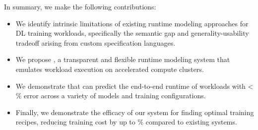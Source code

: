 \noindent In summary, we make the following contributions:

\begin{itemize}[leftmargin=*,itemsep=3pt,topsep=3pt]
\item We identify intrinsic limitations of existing runtime modeling approaches for DL training workloads, specifically the semantic gap and generality-usability tradeoff arising from custom specification languages.
\item We propose \sysname, a transparent and flexible runtime modeling system that emulates workload execution on accelerated compute clusters.
\item We demonstrate that \sysname can predict the end-to-end runtime of workloads with < \evalpe{}\% error across a variety of models and training configurations.
\item Finally, we demonstrate the efficacy of our system for finding optimal training recipes, reducing training cost by up to \evaltc{}\% compared to existing systems.
\end{itemize}



















